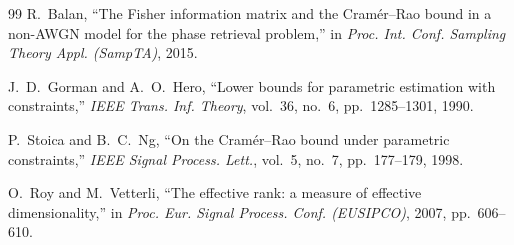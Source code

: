 \documentclass[journal]{IEEEtran}
\begin{document}
\begin{thebibliography}{99}
R.~Balan,
``The Fisher information matrix and the Cram\'er--Rao bound in a non-AWGN model for the phase retrieval problem,''
in \emph{Proc. Int. Conf. Sampling Theory Appl. (SampTA)},
2015.

J.~D.~Gorman and A.~O.~Hero,
``Lower bounds for parametric estimation with constraints,''
\emph{IEEE Trans. Inf. Theory},
vol.~36, no.~6, pp.~1285--1301, 1990.

P.~Stoica and B.~C.~Ng,
``On the Cram\'er--Rao bound under parametric constraints,''
\emph{IEEE Signal Process. Lett.},
vol.~5, no.~7, pp.~177--179, 1998.

O.~Roy and M.~Vetterli,
``The effective rank: a measure of effective dimensionality,''
in \emph{Proc. Eur. Signal Process. Conf. (EUSIPCO)},
2007, pp.~606--610.

\end{thebibliography}
\end{document}
